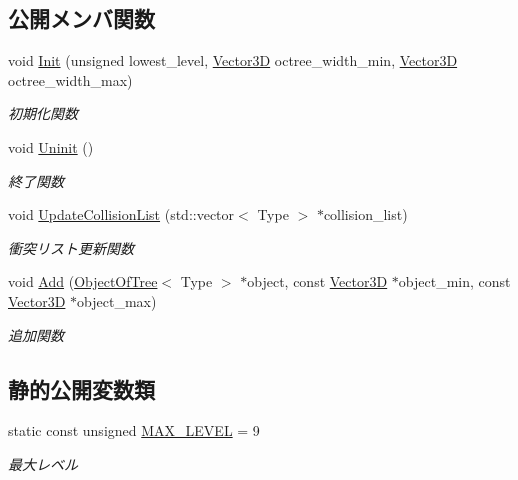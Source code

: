 \subsection*{公開メンバ関数}
\begin{DoxyCompactItemize}
\item 
void \mbox{\hyperlink{class_liner_octree_ac6729faf11a52abc056cd3c39a14d312}{Init}} (unsigned lowest\+\_\+level, \mbox{\hyperlink{class_vector3_d}{Vector3D}} octree\+\_\+width\+\_\+min, \mbox{\hyperlink{class_vector3_d}{Vector3D}} octree\+\_\+width\+\_\+max)
\begin{DoxyCompactList}\small\item\em 初期化関数 \end{DoxyCompactList}\item 
void \mbox{\hyperlink{class_liner_octree_a86b5b9bc86630644e84508ff385cda69}{Uninit}} ()
\begin{DoxyCompactList}\small\item\em 終了関数 \end{DoxyCompactList}\item 
void \mbox{\hyperlink{class_liner_octree_a89f700400ce575b869633328755d23cb}{Update\+Collision\+List}} (std\+::vector$<$ Type $>$ $\ast$collision\+\_\+list)
\begin{DoxyCompactList}\small\item\em 衝突リスト更新関数 \end{DoxyCompactList}\item 
void \mbox{\hyperlink{class_liner_octree_a3eaccf8098efa5354aecb4f682ffd400}{Add}} (\mbox{\hyperlink{class_object_of_tree}{Object\+Of\+Tree}}$<$ Type $>$ $\ast$object, const \mbox{\hyperlink{class_vector3_d}{Vector3D}} $\ast$object\+\_\+min, const \mbox{\hyperlink{class_vector3_d}{Vector3D}} $\ast$object\+\_\+max)
\begin{DoxyCompactList}\small\item\em 追加関数 \end{DoxyCompactList}\end{DoxyCompactItemize}
\subsection*{静的公開変数類}
\begin{DoxyCompactItemize}
\item 
static const unsigned \mbox{\hyperlink{class_liner_octree_aced865f2822181486eb805e4db1f0a32}{M\+A\+X\+\_\+\+L\+E\+V\+EL}} = 9
\begin{DoxyCompactList}\small\item\em 最大レベル \end{DoxyCompactList}\end{DoxyCompactItemize}
